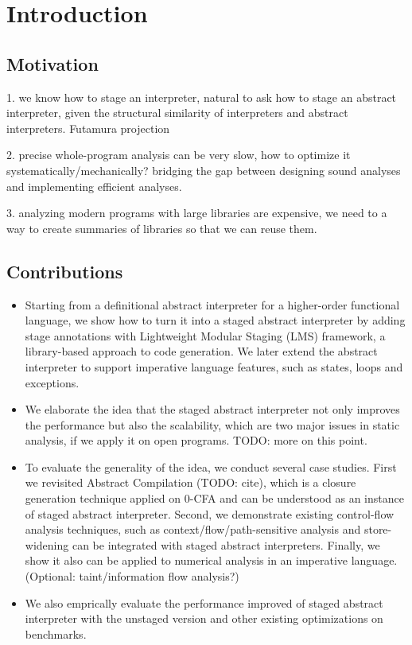\section{Introduction}

\subsection{Motivation}

1. we know how to stage an interpreter, natural to ask how to stage an abstract interpreter, given 
the structural similarity of interpreters and abstract interpreters. Futamura projection \cite{Futamura1999}

2. precise whole-program analysis can be very slow, how to optimize it systematically/mechanically?
bridging the gap between designing sound analyses and implementing efficient analyses.

3. analyzing modern programs with large libraries are expensive, we need to a way to create
summaries of libraries so that we can reuse them.

\subsection{Contributions}

\begin{itemize}
\item Starting from a definitional abstract interpreter for a higher-order functional language,
  we show how to turn it into a staged abstract interpreter by adding stage annotations with 
  Lightweight Modular Staging (LMS) framework, a library-based approach to code generation. 
  We later extend the abstract interpreter to support
  imperative language features, such as states, loops and exceptions.
\item We elaborate the idea that the staged abstract interpreter not only improves the performance 
  but also the scalability, which are two major issues in static analysis, if we apply it on open
  programs. TODO: more on this point.
\item To evaluate the generality of the idea, we conduct several case studies. 
  First we revisited Abstract Compilation (TODO: cite), which is a closure generation technique applied 
  on 0-CFA and can be understood as an instance of staged abstract interpreter. 
  Second, we demonstrate existing control-flow analysis techniques, such as context/flow/path-sensitive 
  analysis and store-widening can be integrated with staged abstract interpreters.
  Finally, we show it also can be applied to numerical analysis in an imperative language.
  (Optional: taint/information flow analysis?)
\item We also emprically evaluate the performance improved of staged abstract interpreter with the
  unstaged version and other existing optimizations on benchmarks.
\end{itemize}
